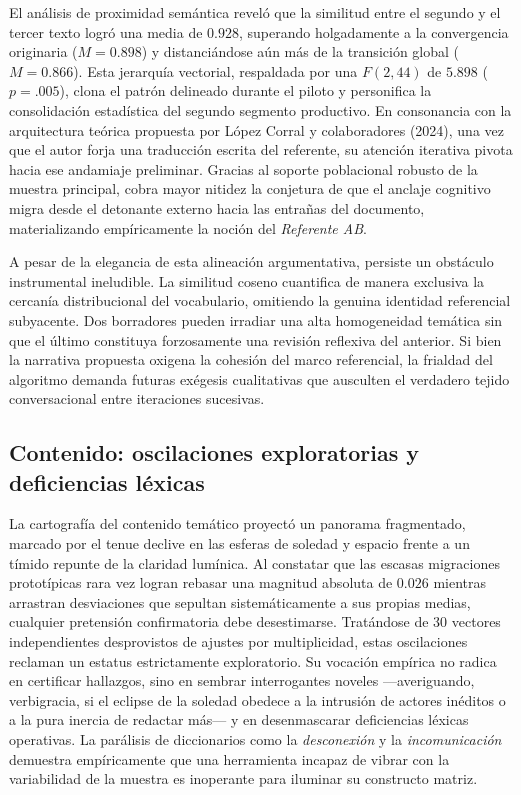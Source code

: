 \documentclass[12pt]{article}
\begin{document}
	El análisis de proximidad semántica reveló que la similitud entre el segundo y el tercer texto logró una media de $0.928$, superando holgadamente a la convergencia originaria ($M = 0.898$) y distanciándose aún más de la transición global ($M = 0.866$). Esta jerarquía vectorial, respaldada por una $F(2,44)$ de $5.898$ ($p = .005$), clona el patrón delineado durante el piloto y personifica la consolidación estadística del segundo segmento productivo. En consonancia con la arquitectura teórica propuesta por López Corral y colaboradores (2024), una vez que el autor forja una traducción escrita del referente, su atención iterativa pivota hacia ese andamiaje preliminar. Gracias al soporte poblacional robusto de la muestra principal, cobra mayor nitidez la conjetura de que el anclaje cognitivo migra desde el detonante externo hacia las entrañas del documento, materializando empíricamente la noción del \emph{Referente AB}.
	
	A pesar de la elegancia de esta alineación argumentativa, persiste un obstáculo instrumental ineludible. La similitud coseno cuantifica de manera exclusiva la cercanía distribucional del vocabulario, omitiendo la genuina identidad referencial subyacente. Dos borradores pueden irradiar una alta homogeneidad temática sin que el último constituya forzosamente una revisión reflexiva del anterior. Si bien la narrativa propuesta oxigena la cohesión del marco referencial, la frialdad del algoritmo demanda futuras exégesis cualitativas que ausculten el verdadero tejido conversacional entre iteraciones sucesivas.
	
	\subsection{Contenido: oscilaciones exploratorias y deficiencias léxicas}
	
	La cartografía del contenido temático proyectó un panorama fragmentado, marcado por el tenue declive en las esferas de soledad y espacio frente a un tímido repunte de la claridad lumínica. Al constatar que las escasas migraciones prototípicas rara vez logran rebasar una magnitud absoluta de $0.026$ mientras arrastran desviaciones que sepultan sistemáticamente a sus propias medias, cualquier pretensión confirmatoria debe desestimarse. Tratándose de 30 vectores independientes desprovistos de ajustes por multiplicidad, estas oscilaciones reclaman un estatus estrictamente exploratorio. Su vocación empírica no radica en certificar hallazgos, sino en sembrar interrogantes noveles —averiguando, verbigracia, si el eclipse de la soledad obedece a la intrusión de actores inéditos o a la pura inercia de redactar más— y en desenmascarar deficiencias léxicas operativas. La parálisis de diccionarios como la \emph{desconexión} y la \emph{incomunicación} demuestra empíricamente que una herramienta incapaz de vibrar con la variabilidad de la muestra es inoperante para iluminar su constructo matriz.
	
\end{document}
